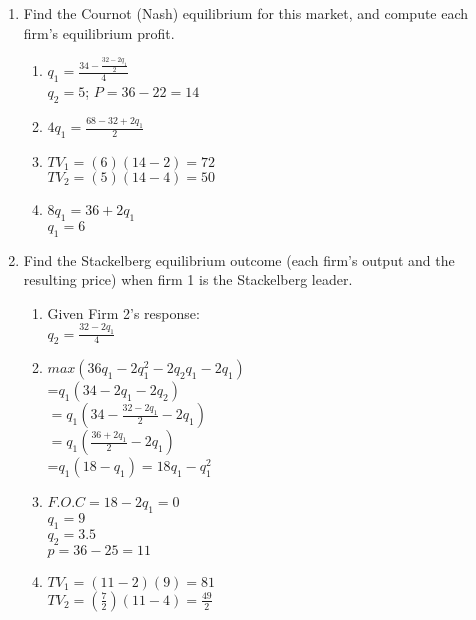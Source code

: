\documentclass[11pt]{article}
\begin{document}
\begin{enumerate}
\begin{enumerate}
        \item Find the Cournot (Nash) equilibrium for this market, and compute each firm's equilibrium profit.
        \begin{enumerate}
            \item $q_1 = \frac{34 - \frac{32-2q_1}{2}}{4}$\\
            $q_2 = 5$; $P = 36 - 22 = 14$
            \item $4q_1 = \frac{68-32+2q_1}{2}$
            \item $TV_1 = (6)(14-2) = 72$
            \\$TV_2 = (5)(14-4) = 50$
            \item $8q_1 = 36 + 2q_1$\\
            $q_1 = 6$
        \end{enumerate}
        
        \item Find the Stackelberg equilibrium outcome (each firm's output and the resulting price) when firm 1 is the Stackelberg leader.
        \begin{enumerate}
            \item Given Firm 2's response:\\
            $q_2 = \frac{32-2q_1}{4}$
            \item $max(36q_1 - 2q_1^2 - 2q_2q_1 - 2q_1)$\\
            =$q_1(34-2q_1-2q_2)$\\
            $=q_1(34-\frac{32-2q_1}{2}-2q_1)$
            \\$=q_1(\frac{36+2q_1}{2}-2q_1)$\\
            =$q_1(18-q_1) = 18q_1 - q_1^2$
            \item $F.O.C = 18 - 2q_1 = 0$\\
            $q_1 = 9$\\ $q_2 = 3.5$\\ $p = 36 - 25 = 11$
            \item $TV_1 = (11-2)(9) = 81$\\
            $TV_2 = (\frac{7}{2})(11-4) = \frac{49}{2}$
        \end{enumerate}
        

\end{enumerate}
\end{enumerate}
\end{document}
